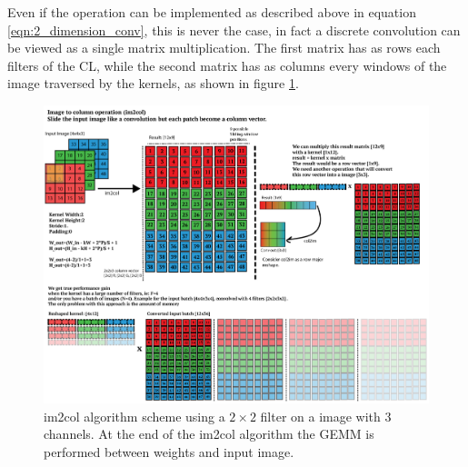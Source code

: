 \documentclass[a4paper, 10pt]{book}
\begin{document}
Even if the operation can be implemented as described above in equation \ref{eqn:2_dimension_conv}, this is never the case, in fact a discrete convolution can be viewed as a single matrix multiplication.
The first matrix has as rows each filters of the CL, while the second matrix has as columns every windows of the image traversed by the kernels,
as shown in figure \ref{fig: convolutional layer _2}.
\begin{figure}[htp]
    \centering
    \includegraphics[width=15cm]{im2col.png}
    \caption{\textsf{im2col} algorithm scheme using a $2\times2$ filter on a image with 3 channels.
At the end of the \textsf{im2col} algorithm the \textsf{GEMM} is performed between weights and input image.
}
    \label{fig: convolutional layer _2}
\end{figure}
\end{document}
